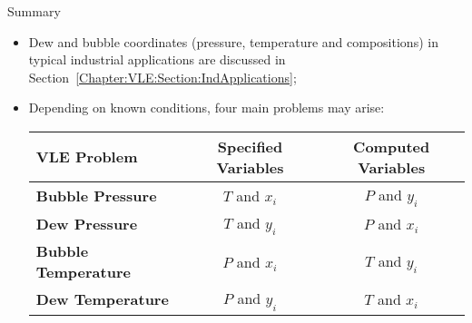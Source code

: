 \begin{FinalSummaryBlock}{Summary}
\begin{itemize}
       \item Dew and bubble coordinates (pressure, temperature and compositions) in typical industrial applications are discussed in Section~\ref{Chapter:VLE:Section:IndApplications};
       \item Depending on known conditions, four main problems may arise:
\begin{center}
   \begin{tabular}{|l c c|}
      \hline 
      $\mathbf{VLE}$ {\bf Problem} & {\bf Specified Variables} &  {\bf Computed Variables} \\  
      \hline
          {\bf Bubble Pressure}        &  $T$ and $x_{i}$           &   $P$ and $y_{i}$          \\
          {\bf Dew Pressure}           &  $T$ and $y_{i}$           &   $P$ and $x_{i}$          \\
          {\bf Bubble Temperature}     &  $P$ and $x_{i}$           &   $T$ and $y_{i}$          \\
          {\bf Dew Temperature}        &  $P$ and $y_{i}$           &   $T$ and $x_{i}$          \\     
      \hline
   \end{tabular}
\end{center}
    \end{itemize}
\end{FinalSummaryBlock}
